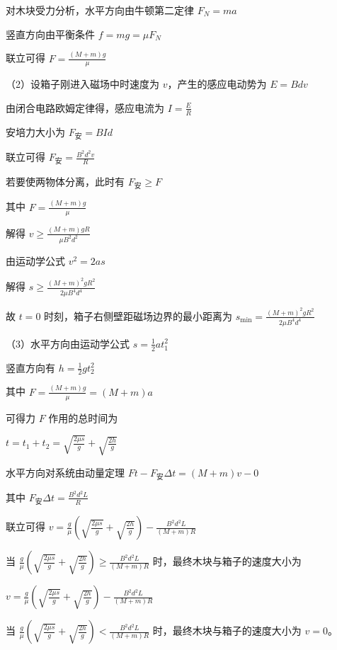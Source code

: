 \documentclass[\gkver]{gaokaozhenti}
\begin{document}
\begin{enumerate}
{对木块受力分析，水平方向由牛顿第二定律 $F_{N} = ma$

竖直方向由平衡条件 $f = mg = \mu F_{N}$

联立可得 $F = \frac{(M + m)g}{\mu}$

（2）设箱子刚进入磁场中时速度为 $v$，产生的感应电动势为 $E = Bdv$

由闭合电路欧姆定律得，感应电流为 $I = \frac{E}{R}$

安培力大小为 $F_{\text{安}} = BId$

联立可得 $F_{\text{安}} = \frac{B^{2}d^{2}v}{R}$

若要使两物体分离，此时有 $F_{\text{安}} \geq F$

其中 $F = \frac{(M + m)g}{\mu}$

解得 $v \geq \frac{(M + m)gR}{\mu B^{2}d^{2}}$

由运动学公式 $v^{2} = 2as$

解得 $s \geq \frac{(M + m)^{2}gR^{2}}{2\mu B^{4}d^{4}}$

故 $t = 0$ 时刻，箱子右侧壁距磁场边界的最小距离为 $s_{\min} = \frac{(M + m)^{2}gR^{2}}{2\mu B^{4}d^{4}}$

（3）水平方向由运动学公式 $s = \frac{1}{2}at_{1}^{2}$

竖直方向有 $h = \frac{1}{2}gt_{2}^{2}$

其中 $F = \frac{(M + m)g}{\mu} = (M + m)a$

可得力 $F$ 作用的总时间为

$t = t_{1} + t_{2} = \sqrt{\frac{2\mu s}{g}} + \sqrt{\frac{2h}{g}}$

水平方向对系统由动量定理 $Ft - F_{\text{安}}\Delta t = (M + m)v - 0$

其中 $F_{\text{安}}\Delta t = \frac{B^{2}d^{2}L}{R}$

联立可得 $v = \frac{g}{\mu}\left(\sqrt{\frac{2\mu s}{g}} + \sqrt{\frac{2h}{g}}\right) - \frac{B^{2}d^{2}L}{(M + m)R}$

当 $\frac{g}{\mu}\left(\sqrt{\frac{2\mu s}{g}} + \sqrt{\frac{2h}{g}}\right) \geq \frac{B^{2}d^{2}L}{(M + m)R}$ 时，最终木块与箱子的速度大小为

$v = \frac{g}{\mu}\left(\sqrt{\frac{2\mu s}{g}} + \sqrt{\frac{2h}{g}}\right) - \frac{B^{2}d^{2}L}{(M + m)R}$

当 $\frac{g}{\mu}\left(\sqrt{\frac{2\mu s}{g}} + \sqrt{\frac{2h}{g}}\right) < \frac{B^{2}d^{2}L}{(M + m)R}$ 时，最终木块与箱子的速度大小为 $v = 0$。
}

\end{enumerate}
\end{document}
